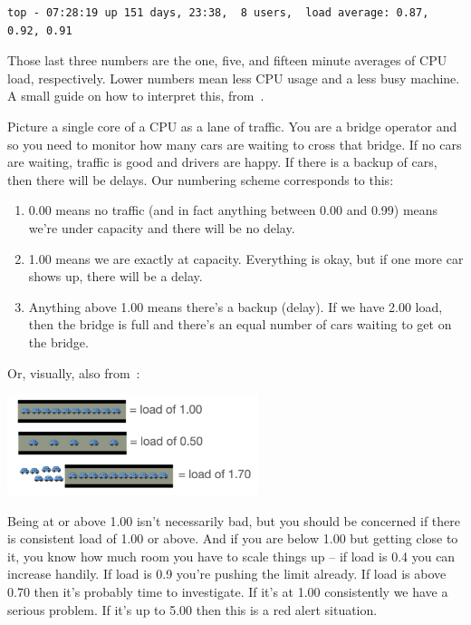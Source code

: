 \documentclass[a4paper]{report}
\begin{document}
\begin{verbatim}
top - 07:28:19 up 151 days, 23:38,  8 users,  load average: 0.87, 0.92, 0.91
\end{verbatim}

Those last three numbers are the one, five, and fifteen minute averages of CPU load, respectively. Lower numbers mean less CPU usage and a less busy machine. A small guide on how to interpret this, from~\cite{scout}.

Picture a single core of a CPU as a lane of traffic. You are a bridge operator and so you need to monitor how many cars are waiting to cross that bridge. If no cars are waiting, traffic is good and drivers are happy. If there is a backup of cars, then there will be delays. Our numbering scheme corresponds to this:

\begin{enumerate}
	\item 0.00 means no traffic (and in fact anything between 0.00 and 0.99) means we're under capacity and there will be no delay.
	\item 1.00 means we are exactly at capacity. Everything is okay, but if one more car shows up, there will be a delay.
	\item Anything above 1.00 means there's a backup (delay). If we have 2.00 load, then the bridge is full and there's an equal number of cars waiting to get on the bridge. 
\end{enumerate}

Or, visually, also from~\cite{scout}:

\begin{center}
	\includegraphics[width=0.55\textwidth]{images/car-analogy.png}
\end{center}

Being at or above 1.00 isn't necessarily bad, but you should be concerned if there is consistent load of 1.00 or above. And if you are below 1.00 but getting close to it, you know how much room you have to scale things up -- if load is 0.4 you can increase handily. If load is 0.9 you're pushing the limit already. If load is above 0.70 then it's probably time to investigate. If it's at 1.00 consistently we have a serious problem. If it's up to 5.00 then this is a red alert situation.
\end{document}

